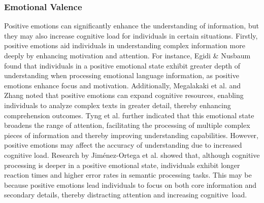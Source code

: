 \subsubsection{Emotional Valence}
Positive emotions can significantly enhance the understanding of information, but they may also increase cognitive load for individuals in certain situations. Firstly, positive emotions aid individuals in understanding complex information more deeply by enhancing motivation and attention. For instance, Egidi \& Nusbaum \cite{egidi2012emotional} found that individuals in a positive emotional state exhibit greater depth of understanding when processing emotional language information, as positive emotions enhance focus and motivation. Additionally, Megalakaki et al. \cite{megalakaki2019effects} and Zhang \cite{zhang2023effect} noted that positive emotions can expand cognitive resources, enabling individuals to analyze complex texts in greater detail, thereby enhancing comprehension outcomes. Tyng et al. \cite{tyng2017influences} further indicated that this emotional state broadens the range of attention, facilitating the processing of multiple complex pieces of information and thereby improving understanding capabilities. However, positive emotions may affect the accuracy of understanding due to increased cognitive load. Research by Jiménez-Ortega et al. \cite{jimenez2012emotional} showed that, although cognitive processing is deeper in a positive emotional state, individuals exhibit longer reaction times and higher error rates in semantic processing tasks. This may be because positive emotions lead individuals to focus on both core information and secondary details, thereby distracting attention and increasing cognitive~load.

